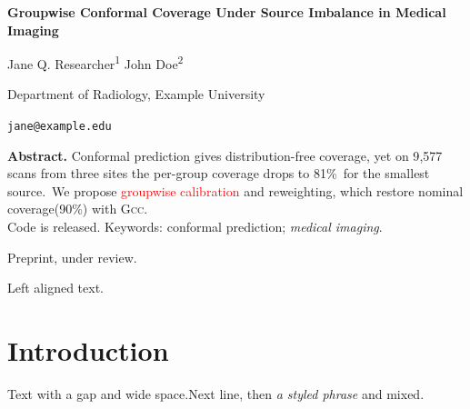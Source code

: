 \documentclass[11pt]{article}
\begin{document}
\begin{center}
{\LARGE\bfseries Groupwise Conformal Coverage Under Source Imbalance in Medical Imaging\par}
\vspace{10pt}
{\large Jane Q. Researcher\textsuperscript{1} \quad John Doe\textsuperscript{2}\par}
\vspace{4pt}
{\normalsize Department of Radiology, Example University\par}
{\small \texttt{jane@example.edu}}
\end{center}

\vspace*{6pt}

\noindent\textbf{Abstract.} Conformal prediction gives distribution-free coverage, yet on
9{,}577 scans from three sites the per-group coverage drops to 81\%~for the
smallest source.\, We propose \textcolor{red}{groupwise calibration} and
{\color{blue} reweighting}, which restore nominal coverage\enspace(90\%) with
\textsc{Gcc}.\\
Code is released.\hfill\linebreak
Keywords: conformal prediction; {\itshape medical imaging}\;\:\!.

\medskip
\begin{flushright}
{\small Preprint, under review.}
\end{flushright}

\begin{flushleft}
Left aligned text.\par
\end{flushleft}

\smallskip
\bigskip
\newpage
\section{Introduction}
Text with \hspace{2em}a gap and \qquad wide space.\newline Next line, then
{\Large\itshape\color[rgb]{0.2,0.4,0.6} a styled phrase} and \textcolor{red!50!blue}{mixed}.
\clearpage
\pagebreak[4]
\end{document}
